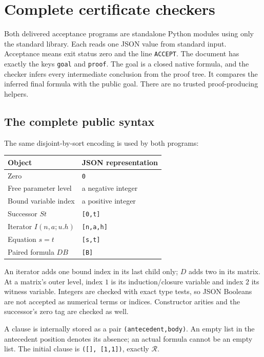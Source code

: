 \documentclass[11pt,letterpaper]{article}
\theoremstyle{definition}\newtheorem{definition}[theorem]{Definition}
\theoremstyle{remark}\newtheorem{remark}[theorem]{Remark}
\begin{document}
\section{Complete certificate checkers}
\label{sec:implementation}

Both delivered acceptance programs are standalone Python modules using only
the standard library. Each reads one JSON value from standard input.
Acceptance means exit status zero and the line \texttt{ACCEPT}. The
document has exactly the keys \texttt{goal} and \texttt{proof}. The
goal is a closed native formula, and the checker infers every intermediate
conclusion from the proof tree. It compares the inferred final formula with
the public goal. There are no trusted proof-producing helpers.

\subsection{The complete public syntax}

The same disjoint-by-sort encoding is used by both programs:
\begin{center}
\begin{tabular}{ll}
\toprule
Object & JSON representation\\
\midrule
Zero & \texttt{0}\\
Free parameter level & a negative integer\\
Bound variable index & a positive integer\\
Successor $St$ & \texttt{[0,t]}\\
Iterator $I(n,a;u.h)$ & \texttt{[n,a,h]}\\
Equation $s=t$ & \texttt{[s,t]}\\
Paired formula $D B$ & \texttt{[B]}\\
\bottomrule
\end{tabular}
\end{center}
An iterator adds one bound index in its last child only; $D$ adds two in
its matrix. At a matrix's outer level, index $1$ is its induction/closure
variable and index $2$ its witness variable. Integers are checked with exact
type tests, so JSON Booleans are not accepted as numerical terms or indices.
Constructor arities and the successor's zero tag are checked as well.

A clause is internally stored as a pair \texttt{(antecedent,body)}.
An empty list in the antecedent position denotes its absence; an actual
formula cannot be an empty list. The initial clause is
\texttt{([], [1,1])}, exactly $\mathcal R$.
\end{document}
